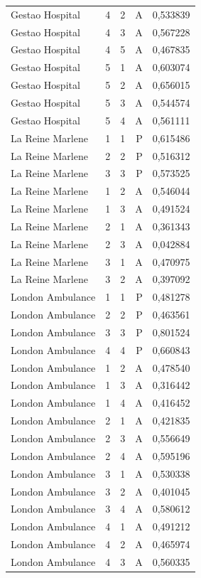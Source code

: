 \begin{longtable}{lrrrr}
Gestao Hospital & 4 & 2 & A & 0,533839 \\
Gestao Hospital & 4 & 3 & A & 0,567228 \\
Gestao Hospital & 4 & 5 & A & 0,467835 \\
Gestao Hospital & 5 & 1 & A & 0,603074 \\
Gestao Hospital & 5 & 2 & A & 0,656015 \\
Gestao Hospital & 5 & 3 & A & 0,544574 \\
Gestao Hospital & 5 & 4 & A & 0,561111 \\
La Reine Marlene & 1 & 1 & P & 0,615486 \\
La Reine Marlene & 2 & 2 & P & 0,516312 \\
La Reine Marlene & 3 & 3 & P & 0,573525 \\
La Reine Marlene & 1 & 2 & A & 0,546044 \\
La Reine Marlene & 1 & 3 & A & 0,491524 \\
La Reine Marlene & 2 & 1 & A & 0,361343 \\
La Reine Marlene & 2 & 3 & A & 0,042884 \\
La Reine Marlene & 3 & 1 & A & 0,470975 \\
La Reine Marlene & 3 & 2 & A & 0,397092 \\
London Ambulance & 1 & 1 & P & 0,481278 \\
London Ambulance & 2 & 2 & P & 0,463561 \\
London Ambulance & 3 & 3 & P & 0,801524 \\
London Ambulance & 4 & 4 & P & 0,660843 \\
London Ambulance & 1 & 2 & A & 0,478540 \\
London Ambulance & 1 & 3 & A & 0,316442 \\
London Ambulance & 1 & 4 & A & 0,416452 \\
London Ambulance & 2 & 1 & A & 0,421835 \\
London Ambulance & 2 & 3 & A & 0,556649 \\
London Ambulance & 2 & 4 & A & 0,595196 \\
London Ambulance & 3 & 1 & A & 0,530338 \\
London Ambulance & 3 & 2 & A & 0,401045 \\
London Ambulance & 3 & 4 & A & 0,580612 \\
London Ambulance & 4 & 1 & A & 0,491212 \\
London Ambulance & 4 & 2 & A & 0,465974 \\
London Ambulance & 4 & 3 & A & 0,560335 \\

\end{longtable}
